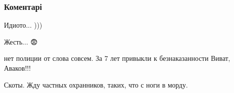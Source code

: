  
 
 
 
 
\subsubsection{Коментарі}
\label{sec:26_07_2021.fb.zharkih_denis.1.ataka_na_laboratoriju.cmt}

\begin{itemize}

 
Идиото... )))

 
Жесть... 😨

 
нет полиции от слова совсем. За 7 лет привыкли к безнаказанности Виват, Аваков!!!

 
Скоты. Жду частных охранников, таких, что с ноги в морду.

 

\end{itemize}
